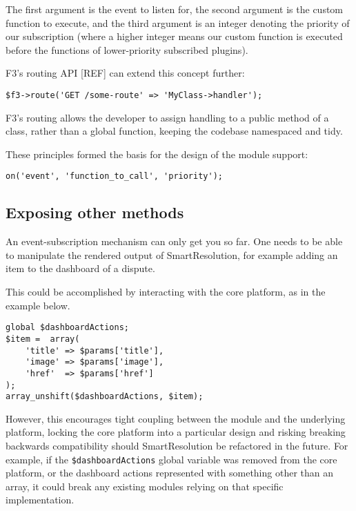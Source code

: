 The first argument is the event to listen for, the second argument is the custom function to execute, and the third argument is an integer denoting the priority of our subscription (where a higher integer means our custom function is executed before the functions of lower-priority subscribed plugins).

F3's routing API [REF] can extend this concept further:

\begin{lstlisting}
$f3->route('GET /some-route' => 'MyClass->handler');
\end{lstlisting}

F3's routing allows the developer to assign handling to a public method of a class, rather than a global function, keeping the codebase namespaced and tidy.

These principles formed the basis for the design of the module support:

\begin{lstlisting}
on('event', 'function_to_call', 'priority');
\end{lstlisting}

\subsection{Exposing other methods}

An event-subscription mechanism can only get you so far. One needs to be able to manipulate the rendered output of SmartResolution, for example adding an item to the dashboard of a dispute.

This could be accomplished by interacting with the core platform, as in the example below.

\begin{lstlisting}
global $dashboardActions;
$item =  array(
    'title' => $params['title'],
    'image' => $params['image'],
    'href'  => $params['href']
);
array_unshift($dashboardActions, $item);
\end{lstlisting}

However, this encourages tight coupling between the module and the underlying platform, locking the core platform into a particular design and risking breaking backwards compatibility should SmartResolution be refactored in the future. For example, if the \lstinline{$dashboardActions} global variable was removed from the core platform, or the dashboard actions represented with something other than an array, it could break any existing modules relying on that specific implementation.

